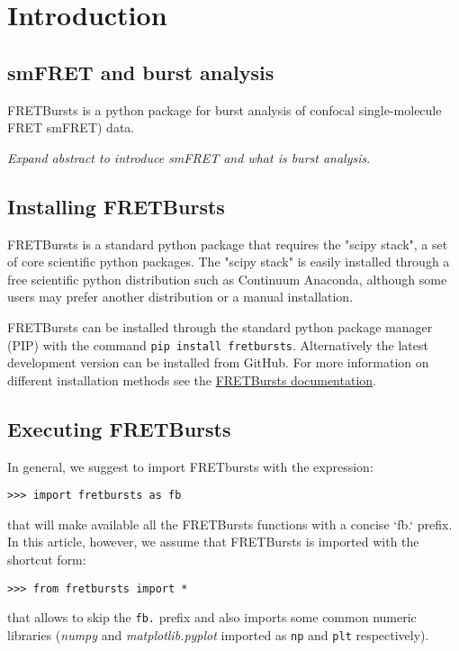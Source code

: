 \section{Introduction}

\subsection{smFRET and burst analysis}

FRETBursts is a python package for burst analysis of confocal single-molecule
FRET smFRET) data.

\textit{Expand abstract to introduce smFRET and what is burst analysis}.

\subsection{Installing FRETBursts}
FRETBursts is a standard python package that requires the "scipy stack", a set
of core 
scientific python packages.
The "scipy stack" is easily installed through a free scientific python
distribution such as Continuum Anaconda, although some users may prefer another
distribution or a manual installation.

FRETBursts can be installed through the standard python package manager (PIP)
with 
the command \texttt{pip install fretbursts}. Alternatively the latest
development version can be installed from GitHub.
For more information on different installation methods see the
\href{http://fretbursts.readthedocs.org/en/latest/installation.html}{FRETBursts
documentation}.

\subsection{Executing FRETBursts}
In general, we suggest to import FRETbursts with the expression:

\begin{verbatim}
>>> import fretbursts as fb
\end{verbatim}

that will make available all the FRETBursts functions with a concise `fb.`
prefix. In this article, however, we assume that FRETBursts is imported with the
shortcut form:

\begin{verbatim}
>>> from fretbursts import *
\end{verbatim}

that allows to skip the \verb|fb.| prefix and also imports some common numeric
libraries (\textit{numpy} and \textit{matplotlib.pyplot} imported as 
\verb|np| and \verb|plt| respectively).

